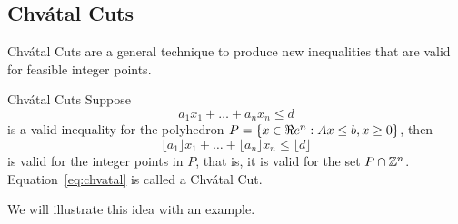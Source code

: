 \subsection{Chv\'atal Cuts}


Chv\'atal Cuts are a general technique to produce new inequalities that are valid for feasible integer points.  


\begin{general}{Chv\'atal Cuts}{}
Suppose 
\begin{equation}
a_1 x_1 + \dots + a_n x_n \leq d
\end{equation}
is a valid inequality for the polyhedron $P = \{ x \in \Re e^n : Ax \leq b, x \geq 0\}$, then 
\begin{equation}
\label{eq:chvatal}
\lfloor a_1\rfloor x_1 + \dots + \lfloor a_n\rfloor  x_n \leq \lfloor d\rfloor
\end{equation}
is valid for the integer points in $P$, that is, it is valid for the set $P \cap {\mathbb{Z}}^n$.  Equation~\eqref{eq:chvatal} is called a Chv\'atal Cut.
\end{general}


We will illustrate this idea with an example.


